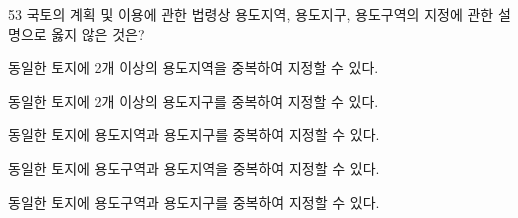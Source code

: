 \begin{question}{53}
국토의 계획 및 이용에 관한 법령상 용도지역, 용도지구, 용도구역의 지정에 관한 설명으로 옳지 않은 것은?
\begin{choices}
  \item 동일한 토지에 2개 이상의 용도지역을 중복하여 지정할 수 있다.
  \item 동일한 토지에 2개 이상의 용도지구를 중복하여 지정할 수 있다.
  \item 동일한 토지에 용도지역과 용도지구를 중복하여 지정할 수 있다.
  \item 동일한 토지에 용도구역과 용도지역을 중복하여 지정할 수 있다.
  \item 동일한 토지에 용도구역과 용도지구를 중복하여 지정할 수 있다.
\end{choices}
\end{question}

